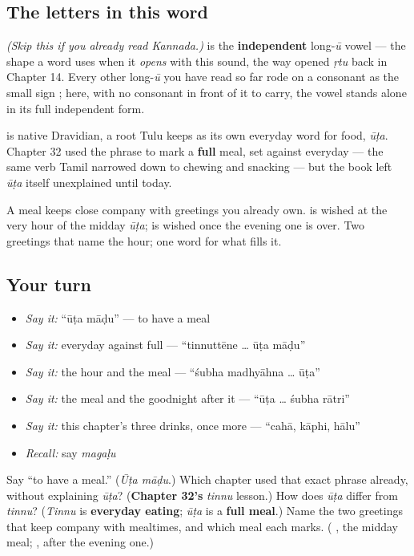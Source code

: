 \subsection*{The letters in this word}
\emph{(Skip this if you already read Kannada.)} \textbf{} is the \textbf{independent} long-\emph{ū} vowel — the shape a word uses when it \emph{opens} with this sound, the way \textbf{} opened \emph{ṛtu} back in Chapter 14. Every other long-\emph{ū} you have read so far rode on a consonant as the small sign \textbf{}; here, with no consonant in front of it to carry, the vowel stands alone in its full independent form.

\begin{cousinweb}
\textbf{} is native Dravidian, a root Tulu keeps as its own everyday word for food, \emph{ūṭa}. Chapter 32 used the phrase \textbf{ } to mark a \textbf{full} meal, set against everyday \textbf{} — the same verb Tamil narrowed down to chewing and snacking — but the book left \emph{ūṭa} itself unexplained until today.

A meal keeps close company with greetings you already own. \textbf{ } is wished at the very hour of the midday \emph{ūṭa}; \textbf{ } is wished once the evening one is over. Two greetings that name the hour; one word for what fills it.
\end{cousinweb}

\subsection*{Your turn}
\begin{itemize}
\raggedright
  \item \emph{Say it:} \textquotedblleft{}ūṭa māḍu\textquotedblright{} — to have a meal
  \item \emph{Say it:} everyday against full — \textquotedblleft{}tinnuttēne … ūṭa māḍu\textquotedblright{}
  \item \emph{Say it:} the hour and the meal — \textquotedblleft{}śubha madhyāhna … ūṭa\textquotedblright{}
  \item \emph{Say it:} the meal and the goodnight after it — \textquotedblleft{}ūṭa … śubha rātri\textquotedblright{}
  \item \emph{Say it:} this chapter's three drinks, once more — \textquotedblleft{}cahā, kāphi, hālu\textquotedblright{}
  \item \emph{Recall:} say \emph{magaḷu}
\end{itemize}

\begin{tcolorbox}[breakable,colback=teal!4,colframe=teal!35!black,title={Before you move on}]
Say \textquotedblleft{}to have a meal.\textquotedblright{} (\emph{Ūṭa māḍu}.) Which chapter used that exact phrase already, without explaining \emph{ūṭa}? (\textbf{Chapter 32's} \emph{tinnu} lesson.) How does \emph{ūṭa} differ from \emph{tinnu}? (\emph{Tinnu} is \textbf{everyday eating}; \emph{ūṭa} is a \textbf{full meal}.) Name the two greetings that keep company with mealtimes, and which meal each marks. (\textbf{ }, the midday meal; \textbf{ }, after the evening one.)
\end{tcolorbox}
